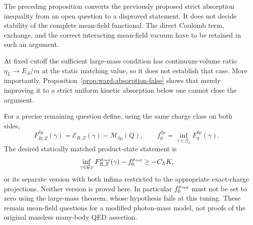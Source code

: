 \begin{remark}
\label{rem:mf-photon-open}
The preceding proposition converts the previously proposed strict
absorption inequality from an open question to a disproved statement.
It does not decide stability of the complete mean-field functional.
The direct Coulomb term, exchange, and the correct interacting mean-field
vacuum have to be retained in such an argument.

At fixed cutoff the sufficient large-mass condition has continuum-volume
ratio $\eta_L\to E_\Lambda/m$ at the static matching value, so it does not establish
that case.  More importantly, Proposition~\ref{prop:ward-absorption-false}
shows that merely improving it to a strict uniform kinetic absorption
below one cannot close the argument.

For a precise remaining question define, using the same charge class on
both sides,
\[
 F_{R,Z}^{\delta\mu}(\gamma)
 =\mathcal E_{R,Z}(\gamma)-\mathcal M_{\delta\mu}(Q),
 \qquad
 f_0^{\delta\mu}=\inf_{\gamma\in\mathcal G_0}F_0^{\delta\mu}(\gamma).
\]
The desired statically matched product-state statement is
\[
 \inf_{\gamma\in\mathcal G_Z}F_{R,Z}^{\mu_{\rm ind}}(\gamma)
       -f_0^{\mu_{\rm ind}}\ge-C_\Lambda K,
\]
or its separate version with both infima restricted to the appropriate
exact-charge projections.  Neither version is proved here.  In particular
$f_0^{\mu_{\rm ind}}$ must not be set to zero using the large-mass theorem,
whose hypothesis fails at this tuning.  These remain mean-field questions
for a modified photon-mass model, not proofs of the original massless
many-body QED assertion.
\end{remark}
